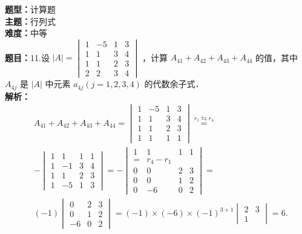 \documentclass{ctexart}
\newenvironment{question}[5]{%
	\noindent\textbf{题型：}#1\\
	\textbf{主题：}#2\\
	\textbf{难度：}#3\\
	\textbf{题目：}#4\\
	\textbf{解析：}#5\\
	\vspace{1em}
}{}
\begin{document}
	\begin{question}
		{计算题}
		{行列式}
		{中等}
		{11.设 \(|A|=\begin{vmatrix}1 & -5 & 1 & 3 \\ 1 & 1 & 3 & 4 \\ 1 & 1 & 2 & 3 \\ 2 & 2 & 3 & 4\end{vmatrix}\) ，计算 \(A_{41}+A_{42}+A_{43}+A_{44}\) 的值，其中 \(A_{4 j}\) 是 \(|A|\) 中元素 \(a_{4 j}(j=1,2,3,4)\) 的代数余子式．}
		{\[
			\begin{aligned}
				& A_{41}+A_{42}+A_{43}+A_{44}=\begin{vmatrix}
					1 & -5 & 1 & 3 \\
					1 & 1 & 3 & 4 \\
					1 & 1 & 2 & 3 \\
					1 & 1 & 1 & 1
				\end{vmatrix} \stackrel{r_1 \leftrightarrows r_4}{=} \\
				& -\begin{vmatrix}
					1 & 1 & 1 & 1 \\
					1 & -1 & 3 & 4 \\
					1 & 1 & 2 & 3 \\
					1 & -5 & 1 & 3
				\end{vmatrix} =-\begin{vmatrix}
					1 & 1 & 1 & 1 \\
					= & r_4-r_1 \\
					0 & 0 & 2 & 3 \\
					0 & 0 & 1 & 2 \\
					0 & -6 & 0 & 2
				\end{vmatrix}= \\
				& (-1)\begin{vmatrix}
					0 & 2 & 3 \\
					0 & 1 & 2 \\
					-6 & 0 & 2
				\end{vmatrix}=(-1) \times(-6) \times(-1)^{3+1}\begin{vmatrix}
					2 & 3 \\
					1
				\end{vmatrix}=6 .
			\end{aligned}
			\]}
	\end{question}
	
\end{document}
